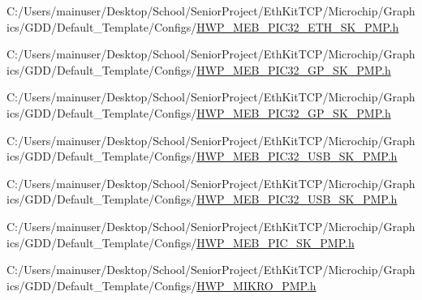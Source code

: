 \begin{DoxyCompactItemize}
C\+:/\+Users/mainuser/\+Desktop/\+School/\+Senior\+Project/\+Eth\+Kit\+T\+C\+P/\+Microchip/\+Graphics/\+G\+D\+D/\+Default\+\_\+\+Template/\+Configs/\hyperlink{_h_w_p___m_e_b___p_i_c32___e_t_h___s_k__8_p_m_p_8h}{H\+W\+P\+\_\+\+M\+E\+B\+\_\+\+P\+I\+C32\+\_\+\+E\+T\+H\+\_\+\+S\+K\+\_\+P\+M\+P.\+h}\item 
C\+:/\+Users/mainuser/\+Desktop/\+School/\+Senior\+Project/\+Eth\+Kit\+T\+C\+P/\+Microchip/\+Graphics/\+G\+D\+D/\+Default\+\_\+\+Template/\+Configs/\hyperlink{_h_w_p___m_e_b___p_i_c32___g_p___s_k__16_p_m_p_8h}{H\+W\+P\+\_\+\+M\+E\+B\+\_\+\+P\+I\+C32\+\_\+\+G\+P\+\_\+\+S\+K\+\_\+P\+M\+P.\+h}\item 
C\+:/\+Users/mainuser/\+Desktop/\+School/\+Senior\+Project/\+Eth\+Kit\+T\+C\+P/\+Microchip/\+Graphics/\+G\+D\+D/\+Default\+\_\+\+Template/\+Configs/\hyperlink{_h_w_p___m_e_b___p_i_c32___g_p___s_k__8_p_m_p_8h}{H\+W\+P\+\_\+\+M\+E\+B\+\_\+\+P\+I\+C32\+\_\+\+G\+P\+\_\+\+S\+K\+\_\+P\+M\+P.\+h}\item 
C\+:/\+Users/mainuser/\+Desktop/\+School/\+Senior\+Project/\+Eth\+Kit\+T\+C\+P/\+Microchip/\+Graphics/\+G\+D\+D/\+Default\+\_\+\+Template/\+Configs/\hyperlink{_h_w_p___m_e_b___p_i_c32___u_s_b___s_k__16_p_m_p_8h}{H\+W\+P\+\_\+\+M\+E\+B\+\_\+\+P\+I\+C32\+\_\+\+U\+S\+B\+\_\+\+S\+K\+\_\+P\+M\+P.\+h}\item 
C\+:/\+Users/mainuser/\+Desktop/\+School/\+Senior\+Project/\+Eth\+Kit\+T\+C\+P/\+Microchip/\+Graphics/\+G\+D\+D/\+Default\+\_\+\+Template/\+Configs/\hyperlink{_h_w_p___m_e_b___p_i_c32___u_s_b___s_k__8_p_m_p_8h}{H\+W\+P\+\_\+\+M\+E\+B\+\_\+\+P\+I\+C32\+\_\+\+U\+S\+B\+\_\+\+S\+K\+\_\+P\+M\+P.\+h}\item 
C\+:/\+Users/mainuser/\+Desktop/\+School/\+Senior\+Project/\+Eth\+Kit\+T\+C\+P/\+Microchip/\+Graphics/\+G\+D\+D/\+Default\+\_\+\+Template/\+Configs/\hyperlink{_h_w_p___m_e_b___p_i_c___s_k__8_p_m_p_8h}{H\+W\+P\+\_\+\+M\+E\+B\+\_\+\+P\+I\+C\+\_\+\+S\+K\+\_\+P\+M\+P.\+h}\item 
C\+:/\+Users/mainuser/\+Desktop/\+School/\+Senior\+Project/\+Eth\+Kit\+T\+C\+P/\+Microchip/\+Graphics/\+G\+D\+D/\+Default\+\_\+\+Template/\+Configs/\hyperlink{_h_w_p___m_i_k_r_o__8_p_m_p_8h}{H\+W\+P\+\_\+\+M\+I\+K\+R\+O\+\_\+P\+M\+P.\+h}\end{DoxyCompactItemize}
